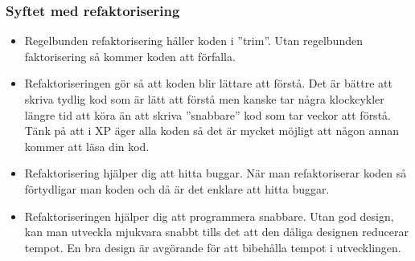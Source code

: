 \documentclass[a4paper]{article}
\begin{document}
\subsubsection*{Syftet med refaktorisering}
\begin{itemize}
\item{Regelbunden refaktorisering håller koden i ''trim''. Utan regelbunden faktorisering så kommer koden att förfalla.}
\item{Refaktoriseringen gör så att koden blir lättare att förstå. Det är bättre att skriva tydlig kod som är lätt att förstå men kanske tar några klockcykler längre tid att köra än att skriva ''snabbare'' kod som tar veckor att förstå. Tänk på att i XP äger alla koden så det är mycket möjligt att någon annan kommer att läsa din kod.}
\item{Refaktorisering hjälper dig att hitta buggar. När man refaktoriserar koden så förtydligar man koden och då är det enklare att hitta buggar.}
\item{Refaktoriseringen hjälper dig att programmera snabbare. Utan god design, kan man utveckla mjukvara snabbt tills det att den dåliga designen reducerar tempot. En bra design är avgörande för att bibehålla tempot i utvecklingen.}
\end{itemize}
\end{document}
